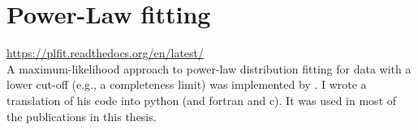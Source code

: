 \section{Power-Law fitting}
\url{https://plfit.readthedocs.org/en/latest/}\\
A maximum-likelihood approach to power-law distribution fitting for data with a
lower cut-off (e.g., a completeness limit) was implemented by
\citet{Clauset2007}.  I wrote a translation of his code into python (and
fortran and c).  It was used in most of the publications in this thesis.



